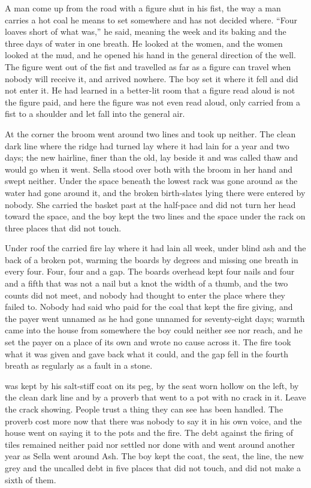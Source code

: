 A man come up from the road with a figure shut in his fist, the way a man carries a hot coal he means to set somewhere and has not decided where. “Four loaves short of what was,” he said, meaning the week and its baking and the three days of water in one breath. He looked at the women, and the women looked at the mud, and he opened his hand in the general direction of the well. The figure went out of the fist and travelled as far as a figure can travel when nobody will receive it, and arrived nowhere. The boy set it where it fell and did not enter it. He had learned in a better-lit room that a figure read aloud is not the figure paid, and here the figure was not even read aloud, only carried from a fist to a shoulder and let fall into the general air.

At the corner the broom went around two lines and took up neither. The clean dark line where the  ridge had turned lay where it had lain for a year and two days; the new hairline, finer than the old, lay beside it and was called thaw and would go when it went. Sella stood over both with the broom in her hand and swept neither. Under  the space beneath the lowest rack was gone around as the water had gone around it, and the broken birth-slates lying there were entered by nobody. She carried the basket past at the half-pace and did not turn her head toward the space, and the boy kept the two lines and the space under the rack on three places that did not touch.

\scenebreak

Under  roof the carried fire lay where it had lain all week, under blind ash and the back of a broken pot, warming the boards by degrees and missing one breath in every four. Four, four and a gap. The boards overhead kept four nails and four and a fifth that was not a nail but a knot the width of a thumb, and the two counts did not meet, and nobody had thought to enter the place where they failed to. Nobody had said who paid for the coal that kept the fire giving, and the payer went unnamed as he had gone unnamed for seventy-eight days; warmth came into the house from somewhere the boy could neither see nor reach, and he set the payer on a place of its own and wrote no cause across it. The fire took what it was given and gave back what it could, and the gap fell in the fourth breath as regularly as a fault in a stone.

 was kept by his salt-stiff coat on its peg, by the seat worn hollow on the left, by the clean dark line and by a proverb that went to a pot with no crack in it. Leave the crack showing. People trust a thing they can see has been handled. The proverb cost more now that there was nobody to say it in his own voice, and the house went on saying it to the pots and the fire. The debt against the firing of tiles remained neither paid nor settled nor done with and went around another year as Sella went around Ash. The boy kept the coat, the seat, the line, the new grey and the uncalled debt in five places that did not touch, and did not make a sixth of them.

